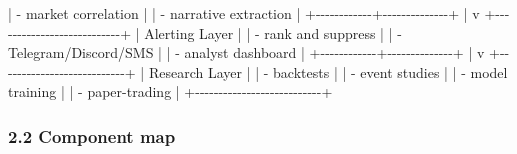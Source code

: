 \documentclass[
]{article}
\newenvironment{Shaded}{}{}
\newcommand{\NormalTok}[1]{#1}
\begin{document}
\begin{Shaded}
\begin{Highlighting}[]
\NormalTok{              |  {-} market correlation     |}
\NormalTok{              |  {-} narrative extraction   |}
\NormalTok{              +{-}{-}{-}{-}{-}{-}{-}{-}{-}{-}{-}{-}+{-}{-}{-}{-}{-}{-}{-}{-}{-}{-}{-}{-}{-}{-}+}
\NormalTok{                           |}
\NormalTok{                           v}
\NormalTok{              +{-}{-}{-}{-}{-}{-}{-}{-}{-}{-}{-}{-}{-}{-}{-}{-}{-}{-}{-}{-}{-}{-}{-}{-}{-}{-}{-}+}
\NormalTok{              |  Alerting Layer           |}
\NormalTok{              |  {-} rank and suppress      |}
\NormalTok{              |  {-} Telegram/Discord/SMS   |}
\NormalTok{              |  {-} analyst dashboard      |}
\NormalTok{              +{-}{-}{-}{-}{-}{-}{-}{-}{-}{-}{-}{-}+{-}{-}{-}{-}{-}{-}{-}{-}{-}{-}{-}{-}{-}{-}+}
\NormalTok{                           |}
\NormalTok{                           v}
\NormalTok{              +{-}{-}{-}{-}{-}{-}{-}{-}{-}{-}{-}{-}{-}{-}{-}{-}{-}{-}{-}{-}{-}{-}{-}{-}{-}{-}{-}+}
\NormalTok{              |  Research Layer           |}
\NormalTok{              |  {-} backtests              |}
\NormalTok{              |  {-} event studies          |}
\NormalTok{              |  {-} model training         |}
\NormalTok{              |  {-} paper{-}trading          |}
\NormalTok{              +{-}{-}{-}{-}{-}{-}{-}{-}{-}{-}{-}{-}{-}{-}{-}{-}{-}{-}{-}{-}{-}{-}{-}{-}{-}{-}{-}+}
\end{Highlighting}
\end{Shaded}

\subsubsection{2.2 Component map}\label{22-component-map}
\end{document}
